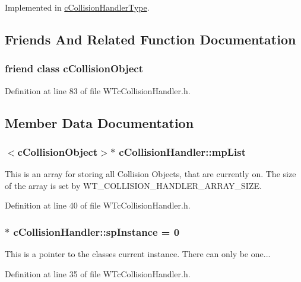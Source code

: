 Implemented in \hyperlink{classc_collision_handler_type_a3d3300c41d38fa8a14c08dd0b94b6c41}{cCollisionHandlerType}.



\subsection{Friends And Related Function Documentation}
\hypertarget{classc_collision_handler_a3fc30c810c62135f498c47205c853e30}{
\subsubsection[{cCollisionObject}]{\setlength{\rightskip}{0pt plus 5cm}friend class {\bf cCollisionObject}}}
\label{classc_collision_handler_a3fc30c810c62135f498c47205c853e30}


Definition at line 83 of file WTcCollisionHandler.h.



\subsection{Member Data Documentation}
\hypertarget{classc_collision_handler_a959870d5beee77a014b29e45bf153723}{
\subsubsection[{mpList}]{$<${\bf cCollisionObject}$>$$\ast$ {\bf cCollisionHandler::mpList}}}
\label{classc_collision_handler_a959870d5beee77a014b29e45bf153723}


This is an array for storing all Collision Objects, that are currently on. The size of the array is set by WT\_\-COLLISION\_\-HANDLER\_\-ARRAY\_\-SIZE. 



Definition at line 40 of file WTcCollisionHandler.h.

\hypertarget{classc_collision_handler_aa1157b48699bb2b8572788a7105554d5}{
\subsubsection[{spInstance}]{ $\ast$ {\bf cCollisionHandler::spInstance} = 0}}
\label{classc_collision_handler_aa1157b48699bb2b8572788a7105554d5}


This is a pointer to the classes current instance. There can only be one... 



Definition at line 35 of file WTcCollisionHandler.h.

